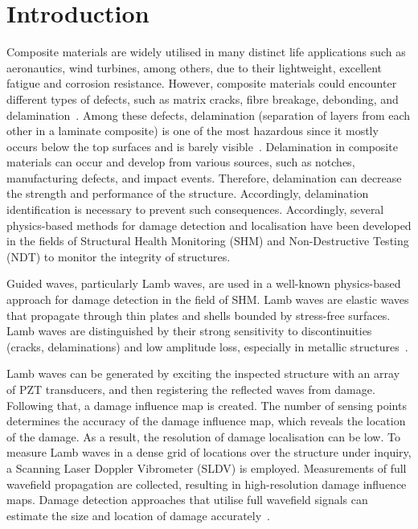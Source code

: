 \documentclass{IOS-Book-Article}
\begin{document}
\section{Introduction}
Composite materials are widely utilised in many distinct life applications such as aeronautics, wind turbines, among others, due to their lightweight, excellent fatigue and corrosion resistance.
However, composite materials could encounter different types of defects, such as matrix cracks, fibre breakage, debonding, and delamination~\cite{smith2009composite, ip2004delamination}. 
Among these defects, delamination (separation of layers from each other in a laminate composite) is one of the most hazardous since it mostly occurs below the top surfaces and is barely visible~\cite{Cai2012a}.
Delamination in composite materials can occur and develop from various sources, such as notches,  manufacturing defects, and impact events. Therefore, delamination can decrease the strength and performance of the structure. 
Accordingly, delamination identification is necessary to prevent such consequences. 
Accordingly, several physics-based methods for damage detection and localisation have been developed in the fields of Structural Health Monitoring (SHM) and Non-Destructive Testing (NDT) to monitor the integrity of structures.

Guided waves, particularly Lamb waves, are used in a well-known physics-based approach for damage detection in the field of SHM.
Lamb waves are elastic waves that propagate through thin plates and shells bounded by stress-free surfaces\cite{mitra2016guided}.
Lamb waves are distinguished by their strong sensitivity to discontinuities (cracks, delaminations) and low amplitude loss, especially in metallic structures~\cite{Keulen2014}.

Lamb waves can be generated by exciting the inspected structure with an array of PZT transducers, and then registering the reflected waves from damage.
Following that, a damage influence map is created.
The number of sensing points determines the accuracy of the damage influence map, which reveals the location of the damage.
As a result, the resolution of damage localisation can be low.
To measure Lamb waves in a dense grid of locations over the structure under inquiry, a Scanning Laser Doppler Vibrometer (SLDV) is employed.
Measurements of full wavefield propagation are collected, resulting in high-resolution damage influence maps.
Damage detection approaches that utilise full wavefield signals can estimate the size and location of damage accurately~\cite{Girolamo2018a, kudela2018impact}.
\end{document}
